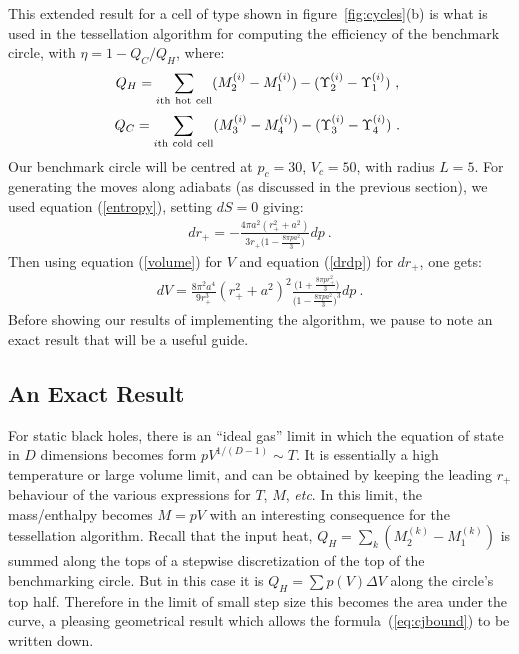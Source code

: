 \documentclass[letterpaper,11pt]{article}
\newcommand{\bea}{\begin{eqnarray}}
\newcommand{\eea}{\end{eqnarray}}
\begin{document}
This extended result for a cell of type shown in figure~\ref{fig:cycles}(b) is what is used in the tessellation algorithm for computing the efficiency of the benchmark circle, with $\eta = 1-{Q_{C}}/{Q_{H}}$, where:
\bea \label{QH}
Q_{H}=\sum_{i{\rm th} \ {\rm hot} \ {\rm cell}} (M^{(i)}_{2}-M^{(i)}_{1})-(\Upsilon^{(i)}_{2}-\Upsilon^{(i)}_{1}) \ , \
\eea
\bea \label{QC}
 Q_{C}=\sum_{i{\rm th} \ {\rm cold} \ {\rm cell}} (M^{(i)}_{3}-M^{(i)}_{4})-(\Upsilon^{(i)}_{3}-\Upsilon^{(i)}_{4}) \ . \
\eea
Our benchmark circle will be centred at  $p_c=30$, $V_c=50$, with  radius $L=5$. For generating the moves along adiabats (as discussed in the previous section), we used equation (\ref{entropy}), setting $dS=0$ giving:
\bea \label{drdp}
dr_{+}=-\frac{4 \pi a^2(r^2_{+}+a^2)}{3r_{+}\Big(1-\frac{8 \pi p a^2}{3}\Big)}dp\ .
\eea
Then using equation (\ref{volume}) for $V$ and equation (\ref{drdp}) for $dr_{+}$, one gets:
\bea \label{dvdp}
dV=\frac{8 \pi ^2 a^4}{9r^3_{+}}(r^2_{+}+a^2)^2 \frac{\Big(1+\frac{8 \pi p r^2_{+}}{3}\Big)}{\Big(1-\frac{8 \pi p a^2}{3}\Big)^3}dp\ .
\eea
Before showing our results of implementing the algorithm, we pause to note an exact result that will be a useful guide.

\subsection{An Exact Result}
\label{sec:exact}

For static black holes, there is an ``ideal gas'' limit in which the equation of state in $D$ dimensions becomes form  $pV^{1/(D-1)}\sim T$. It is essentially a high temperature or large volume limit, and can be obtained by keeping the leading $r_+$ behaviour of the various expressions for $T$, $M$, {\it etc}. In this limit, the mass/enthalpy becomes $M=pV$ with an interesting consequence for the tessellation algorithm. Recall that the  input heat, $Q_H=\sum_k (M_2^{(k)}-M_1^{(k)})$ is summed along the tops of a stepwise discretization of the top of the benchmarking circle. But in this case it is $Q_H=\sum p(V)\Delta V$ along the  circle's top half. Therefore in the limit of small step size this becomes the area under the curve, a pleasing geometrical result which allows the formula~(\ref{eq:cjbound}) to be written down.
\end{document}
